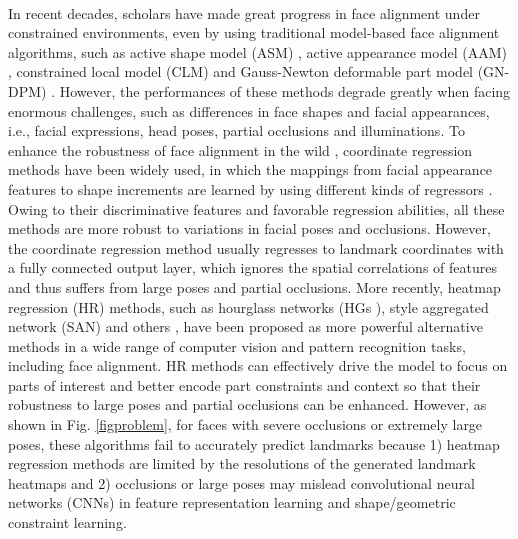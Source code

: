 \documentclass[journal]{IEEEtran}
\begin{document}
\\\indent In recent decades, scholars have made great progress in face alignment under constrained environments, even by using traditional model-based face alignment algorithms, such as active shape model (ASM) \cite{cootes1995active}, active appearance model (AAM) \cite{cootes2001active}, constrained local model (CLM) \cite{Cristinacce2006FeatureDA} and Gauss-Newton deformable part model (GN-DPM) \cite{Tzimiropoulos2014GaussNewtonDP}. However, the performances of these methods degrade greatly when facing enormous challenges, such as differences in face shapes and facial appearances, i.e., facial expressions, head poses, partial occlusions and illuminations. To enhance the robustness of face alignment in the wild \cite{Jin2017FaceAI, Wang2018FacialFP}, coordinate regression methods have been widely used, in which the mappings from facial appearance features to shape increments are learned by using different kinds of regressors \cite{cao2014face, Merget2018RobustFL, Wu2018LookAB}. Owing to their discriminative features and favorable regression abilities, all these methods are more robust to variations in facial poses and occlusions. However, the coordinate regression method usually regresses to landmark coordinates with a fully connected output layer, which ignores the spatial correlations of features and thus suffers from large poses and partial occlusions. More recently, heatmap regression (HR) methods, such as hourglass networks (HGs \cite{Yang2017StackedHN}), style aggregated network (SAN) \cite{Dong2018StyleAN} and others \cite{Bulat2016HumanPE, Liu2019SemanticAF}, have been proposed as more powerful alternative methods in a wide range of computer vision and pattern recognition tasks, including face alignment. HR methods can effectively drive the model to focus on parts of interest and better encode part constraints and context so that their robustness to large poses and partial occlusions can be enhanced. However, as shown in Fig. \ref{figproblem}, for faces with severe occlusions or extremely large poses, these algorithms fail to accurately predict landmarks because 1) heatmap regression methods are limited by the resolutions of the generated landmark heatmaps and 2) occlusions or large poses may mislead convolutional neural networks (CNNs) in feature representation learning and shape/geometric constraint learning.
\end{document}
